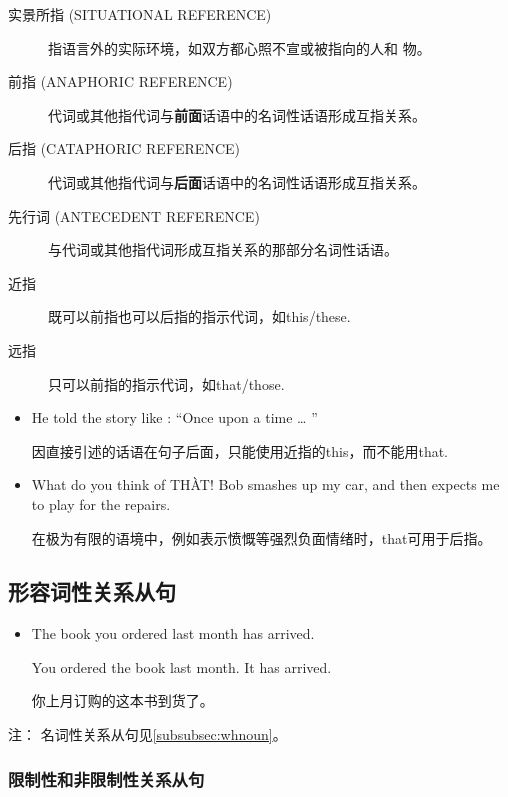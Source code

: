 \begin{description}
\item[实景所指 (SITUATIONAL REFERENCE)] 指语言外的实际环境，如双方都心照不宣或被指向的人和
  物。
\item[前指 (ANAPHORIC REFERENCE)] 代词或其他指代词与\textbf{前面}话语中的名词性话语形成互指关系。
\item[后指 (CATAPHORIC REFERENCE)] 代词或其他指代词与\textbf{后面}话语中的名词性话语形成互指关系。
\item[先行词 (ANTECEDENT REFERENCE)] 与代词或其他指代词形成互指关系的那部分名词性话语。
\item[近指] 既可以前指也可以后指的指示代词，如this/these.
\item[远指] 只可以前指的指示代词，如that/those.
\end{description}

\begin{itemize}

\item He told the story like : ``Once upon a time \ldots{} ''

  因直接引述的话语在句子后面，只能使用近指的this，而不能用that.

\item What do you think of TH\`{A}T! Bob smashes up my car, and then expects me to
  play for the repairs.

  在极为有限的语境中，例如表示愤慨等强烈负面情绪时，that可用于后指。
\end{itemize}

\subsection{形容词性关系从句}

\begin{itemize}
\item The book  you ordered last month has arrived.

  You ordered the book last month. It has arrived.

  你上月订购的这本书到货了。
\end{itemize}

注： 名词性关系从句见\cref{subsubsec:whnoun}。
\subsubsection{限制性和非限制性关系从句}

